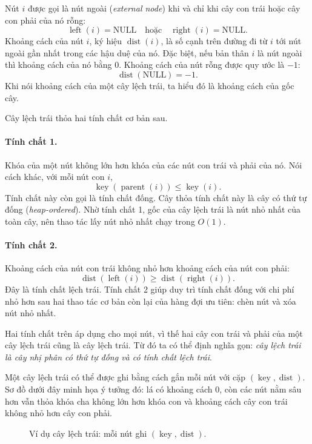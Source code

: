 \documentclass[11pt]{article}
\begin{document}
Nút \(i\) được gọi là nút ngoài (\emph{external node}) khi và chỉ khi cây con
trái hoặc cây con phải của nó rỗng:
\[
  \operatorname{left}(i)=\mathrm{NULL}
  \quad\text{hoặc}\quad
  \operatorname{right}(i)=\mathrm{NULL}.
\]
Khoảng cách của nút \(i\), ký hiệu \(\operatorname{dist}(i)\), là số cạnh trên
đường đi từ \(i\) tới nút ngoài gần nhất trong các hậu duệ của nó. Đặc biệt, nếu
bản thân \(i\) là nút ngoài thì khoảng cách của nó bằng \(0\). Khoảng cách của
nút rỗng được quy ước là \(-1\):
\[
  \operatorname{dist}(\mathrm{NULL})=-1.
\]
Khi nói khoảng cách của một cây lệch trái, ta hiểu đó là khoảng cách của gốc cây.

Cây lệch trái thỏa hai tính chất cơ bản sau.

\paragraph{Tính chất 1.}
Khóa của một nút không lớn hơn khóa của các nút con trái và phải của nó. Nói
cách khác, với mỗi nút con \(i\),
\[
  \operatorname{key}(\operatorname{parent}(i)) \le \operatorname{key}(i).
\]
Tính chất này còn gọi là tính chất đống. Cây thỏa tính chất này là cây có thứ
tự đống (\emph{heap-ordered}). Nhờ tính chất 1, gốc của cây lệch trái là nút nhỏ
nhất của toàn cây, nên thao tác lấy nút nhỏ nhất chạy trong \(O(1)\).

\paragraph{Tính chất 2.}
Khoảng cách của nút con trái không nhỏ hơn khoảng cách của nút con phải:
\[
  \operatorname{dist}(\operatorname{left}(i))
  \ge
  \operatorname{dist}(\operatorname{right}(i)).
\]
Đây là tính chất lệch trái. Tính chất 2 giúp duy trì tính chất đống với chi phí
nhỏ hơn sau hai thao tác cơ bản còn lại của hàng đợi ưu tiên: chèn nút và xóa
nút nhỏ nhất.

Hai tính chất trên áp dụng cho mọi nút, vì thế hai cây con trái và phải của một
cây lệch trái cũng là cây lệch trái. Từ đó ta có thể định nghĩa gọn:
\emph{cây lệch trái là cây nhị phân có thứ tự đống và có tính chất lệch trái}.

Một cây lệch trái có thể được ghi bằng cách gắn mỗi nút với cặp
\((\operatorname{key},\operatorname{dist})\). Sơ đồ dưới đây minh họa ý tưởng
đó: lá có khoảng cách \(0\), còn các nút nằm sâu hơn vẫn thỏa
khóa cha không lớn hơn khóa con và khoảng cách cây con trái không nhỏ hơn cây
con phải.

\begin{figure}[ht]
\centering
{}
\caption{Ví dụ cây lệch trái: mỗi nút ghi \((\operatorname{key},\operatorname{dist})\).}
\end{figure}
\end{document}
